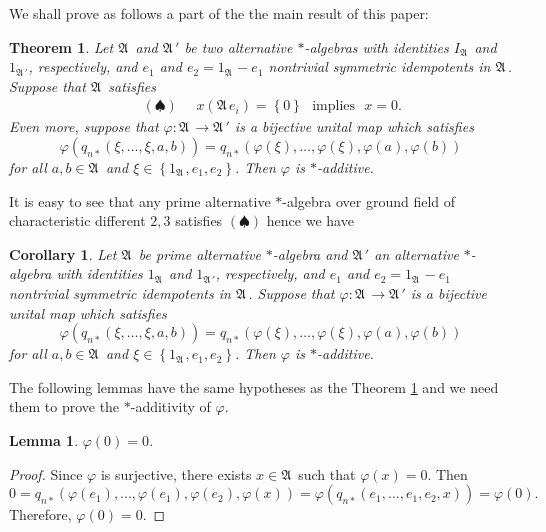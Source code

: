 \documentclass{amsart}
\newtheorem{theorem}{Theorem}[section]
\newtheorem{corollary}{Corollary}[section]
\newtheorem{lemma}{Lemma}[section]
\def\A{{\mathfrak A}\, }
\begin{document}
We shall prove as follows a part of the the main result of this paper:

\begin{theorem}\label{mainthm1} 
Let $\A$ and $\A'$ be two alternative $*$-algebras with identities $I_{\A}$ and $1_{\A'}$, respectively, and $e_1$ and $e_2 = 1_{\A} - e_1$ nontrivial symmetric idempotents in $\A$. Suppose that $\A$ satisfies
\begin{eqnarray*}
  &&\left(\spadesuit\right) \ \ \  \ \ \  x (\A e_i) = \left\{0\right\} \ \ \  \mbox{implies} \ \ \ x = 0.
\end{eqnarray*}
Even more, suppose that $\varphi: \A \rightarrow \A'$ is a bijective unital map which satisfies
\[
\varphi(q_{n*}(\xi, \ldots,\xi, a,b)) = q_{n*}(\varphi(\xi),\ldots,\varphi(\xi),\varphi(a),\varphi(b))
\]
for all $a, b \in \A$ and $\xi \in \left\{1_{\A}, e_1, e_2\right\}$. Then $\varphi$ is $*$-additive.
\end{theorem}



It is easy to see that any prime alternative $*$-algebra over ground field of characteristic different $2,3$  satisfies $\left(\spadesuit\right)$ hence we have  

\begin{corollary}
Let $\A$ be prime alternative $*$-algebra and $\A'$ an alternative $*$-algebra with identities $1_{\A}$ and $1_{\A'}$, respectively, and $e_1$ and $e_2 = 1_{\A} - e_1$ nontrivial symmetric idempotents in $\A$. Suppose that $\varphi: \A \rightarrow \A'$ is a bijective unital map which satisfies
\[
\varphi(q_{n*}(\xi, \ldots,\xi, a,b)) = q_{n*}(\varphi(\xi),\ldots,\varphi(\xi),\varphi(a),\varphi(b))
\]
for all $a, b \in \A$ and $\xi \in \left\{1_{\A}, e_1, e_2\right\}$. Then $\varphi$ is $*$-additive.

\end{corollary}

The following lemmas have the same hypotheses as the Theorem \ref{mainthm1} and we need them to prove the $*$-additivity of $\varphi$. 

\begin{lemma}\label{Claim1}  $\varphi(0) = 0$.
\end{lemma}

\begin{proof}
Since $\varphi$ is surjective, there exists $x \in \A$ such that $\varphi(x) = 0$. Then
$$
0 = q_{n*}(\varphi(e_1),...,\varphi(e_1),\varphi(e_2),\varphi(x)) = \varphi(q_{n*}(e_1,...,e_1,e_2,x)) = \varphi(0).
$$
Therefore, $\varphi(0) = 0$.
\end{proof}
 
\end{document}
